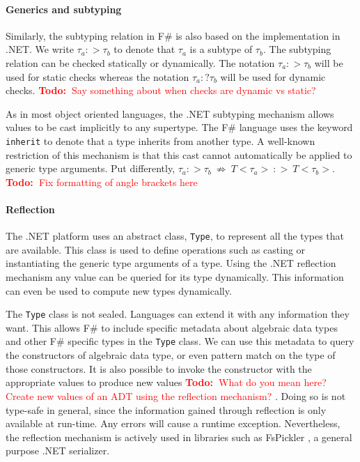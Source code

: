 \documentclass{sigplanconf}
\newcommand{\todo}[1]{
\ifthenelse
  {\boolean{showNotes}}
  {\textcolor{red}{\textbf{Todo:~}#1}}
  {}}
\begin{document}
\paragraph{Generics and subtyping}

Similarly, the subtyping relation in F\# is also based on the
implementation in .NET.  We write $\tau_a :> \tau_b$ to denote that
$\tau_a$ is a subtype of $\tau_b$. The subtyping relation can be
checked statically or dynamically. The notation $\tau_a :> \tau_b$
will be used for static checks whereas the notation $\tau_a :? \tau_b$
will be used for dynamic checks. \todo{Say something about when checks
  are dynamic vs static?}

As in most object oriented languages, the .NET subtyping mechanism
allows values to be cast implicitly to any supertype.  The F\#
language uses the keyword \verb+inherit+ to denote that a type
inherits from another type. A well-known restriction of this mechanism
is that this cast cannot automatically be applied to generic type
arguments. Put differently, $\tau_a :> \tau_b\ \not\Rightarrow\
T<\tau_a> \ :> \ T<\tau_b>$. \todo{Fix formatting of angle brackets
  here}

\paragraph{Reflection}

The .NET platform uses an abstract class, \verb+Type+, to represent
all the types that are available. This class is used to define
operations such as casting or instantiating the generic type arguments
of a type. Using the .NET reflection mechanism any value can be
queried for its type dynamically. This information can even be used to
compute new types dynamically.

The \verb+Type+ class is not sealed. Languages can extend it with any
information they want. This allows F\# to include specific metadata
about algebraic data types and other F\# specific types in the
\verb+Type+ class.  We can use this metadata to query the constructors
of algebraic data type, or even pattern match on the type of those
constructors. It is also possible to invoke the constructor with the
appropriate values to produce new values\todo{What do you mean here?
  Create new values of an ADT using the reflection mechanism?}. Doing
so is not type-safe in general, since the information gained through
reflection is only available at run-time. Any errors will cause a
runtime exception. Nevertheless, the reflection mechanism is actively
used in libraries such as FsPickler \cite{FsPickler}, a general
purpose .NET serializer.
\end{document}
